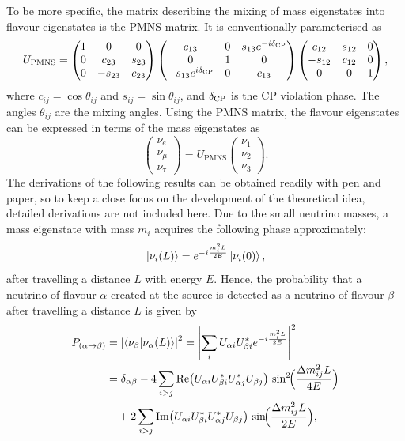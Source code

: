 To be more specific, the matrix describing the mixing of mass eigenstates into flavour eigenstates is the PMNS matrix.
It is conventionally parameterised as 
\begin{equation}
U_{\text{PMNS}} = 
\begin{pmatrix}
1 & 0 & 0 \\
0 & c_{23} & s_{23} \\
0 & -s_{23} & c_{23}
\end{pmatrix}
\begin{pmatrix}
c_{13} & 0 & s_{13} e^{-i\delta_\textrm{CP}} \\
0 & 1 & 0 \\
-s_{13} e^{i\delta_\textrm{CP}} & 0 & c_{13}
\end{pmatrix}
\begin{pmatrix}
c_{12} & s_{12} & 0 \\
-s_{12} & c_{12} & 0 \\
0 & 0 & 1
\end{pmatrix},
\end{equation}
where $c_{ij} = \cos\theta_{ij}$ and $s_{ij} = \sin\theta_{ij}$, and $\delta_\textrm{CP}$ is the CP violation phase.
The angles $\theta_{ij}$ are the mixing angles. 
Using the PMNS matrix, the flavour eigenstates can be expressed in terms of the mass eigenstates as 
\begin{equation}
\begin{pmatrix}
\nu_e \\
\nu_\mu \\
\nu_\tau
\end{pmatrix}
=
U_{\text{PMNS}}
\begin{pmatrix}
\nu_1 \\
\nu_2 \\
\nu_3
\end{pmatrix}.
\end{equation}
The derivations of the following results can be obtained readily with pen and paper, so 
to keep a close focus on the development of the theoretical idea, detailed derivations are not included here. 
Due to the small neutrino masses, a mass eigenstate with mass $m_i$ acquires the following phase approximately:
\begin{equation}
  \ket{\nu_i(L)} = e^{-i \frac{m_i^2 L}{2E}} \ket{\nu_i(0)},
\end{equation}
after travelling a distance $L$ with energy $E$.
Hence, the probability that a neutrino of flavour $\alpha$ created at the source is detected as a neutrino of flavour $\beta$ after travelling a distance $L$ is given by
\begin{align}
  P_{(\alpha \to \beta)} &= \left|\braket{\nu_\beta | \nu_\alpha(L)} \right|^2 = \left| \sum_i U_{\alpha i} U^*_{\beta i} e^{-i \frac{m_i^2 L}{2E}} \right|^2 \\
  &= \delta_{\alpha\beta} - 4 \sum_{i>j} \text{Re} \bigl( U_{\alpha i} U^*_{\beta i} U^*_{\alpha j} U_{\beta j} \bigr) \,\sin^2 \!\Bigl( \frac{\Delta m^2_{ij} L}{4E} \Bigr) \\
  &\quad + 2 \sum_{i>j} \text{Im} \bigl( U_{\alpha i} U^*_{\beta i} U^*_{\alpha j} U_{\beta j} \bigr) \,\sin \!\Bigl( \frac{\Delta m^2_{ij} L}{2E} \Bigr),
\end{align}
